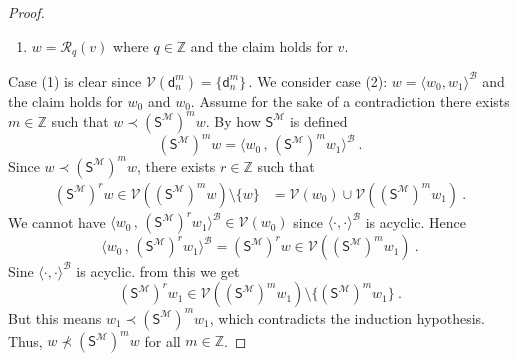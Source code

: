 \documentclass[10pt,a4paper, openany,  oldfontcommands]{memoir}
\newtheorem{open problem} [theorem] {Open Problem}
\newtheorem{open question} [theorem] {Open Question}
\renewcommand{\mathrm}{\mathsf}
\begin{document}
\begin{proof}
\begin{enumerate}
\item    $  w  =  \mathcal{R}_q  \left(  v  \right)  $   where   $  q  \in  \mathbb{Z}   $  and the claim holds for  $  v $. 
\end{enumerate}
Case (1) is clear since  $  \mathcal{V} \left(  \mathsf{d}^m_n  \right)  =  \lbrace    \mathsf{d}^m_n    \rbrace   \,   $. 
 We consider   case  (2):    $  w  =  \langle  w_0,  w_1  \rangle^{  \mathcal{B} }  $  and the claim holds for  $  w_0$  and $ w_0  $. 
 Assume for the sake of a contradiction there exists  $  m  \in  \mathbb{Z}  $  such that     $  w  \prec      \left(  \mathrm{S}^{  \mathcal{M} }  \right)^m  w   $.
   By how    $  \mathrm{S}^{  \mathcal{M} }  $  is defined 
 \[
  \left(  \mathrm{S}^{  \mathcal{M} }  \right)^m  w
  = 
    \langle  w_0   \,  ,   \,     \left(  \mathrm{S}^{  \mathcal{M} }  \right)^m  w_1  \rangle^{  \mathcal{B} }  
    \         .
 \]
 Since   $  w  \prec      \left(  \mathrm{S}^{  \mathcal{M} }  \right)^m  w   $,    
 there exists  $  r  \in  \mathbb{Z}  $    such that  
\begin{align*}
  \left(  \mathrm{S}^{  \mathcal{M} }  \right)^r  w   \in     \mathcal{V}  \left(   \left(  \mathrm{S}^{  \mathcal{M} }  \right)^m  w    \right)   \setminus  \lbrace  w  \rbrace 
  & =  
 \mathcal{V}  \left(   w_0     \right)   \cup    \mathcal{V}  \left(   \left(  \mathrm{S}^{  \mathcal{M} }  \right)^m  w_1    \right) 
\     .
\end{align*}
We cannot have   $    \langle  w_0   \,  ,   \,     \left(  \mathrm{S}^{  \mathcal{M} }  \right)^r  w_1  \rangle^{  \mathcal{B} }   
   \in    \mathcal{V} \left(   w_0     \right)  $
since   $  \langle  \cdot  ,  \cdot  \rangle^{  \mathcal{B} }  $  is acyclic. 
Hence      
\[
     \langle  w_0   \,  ,   \,     \left(  \mathrm{S}^{  \mathcal{M} }  \right)^r  w_1  \rangle^{  \mathcal{B} }  
   =  
      \left(  \mathrm{S}^{  \mathcal{M} }  \right)^r  w   
    \in 
         \mathcal{V}  \left(   \left(  \mathrm{S}^{  \mathcal{M} }  \right)^m  w_1    \right)   
    \        .
    \]
 Sine     $  \langle  \cdot  ,  \cdot  \rangle^{  \mathcal{B} }  $  is acyclic.    from this we get  
\[
  \left(  \mathrm{S}^{    \mathcal{M} }  \right)^r    w_1  \in   \mathcal{V}  \left(   \left(  \mathrm{S}^{  \mathcal{M} }  \right)^m  w_1    \right) 
  \setminus  \lbrace  \left(  \mathrm{S}^{  \mathcal{M} }  \right)^m  w_1    \rbrace    
  \     .
  \]
But this means   $  w_1    \prec   \left(  \mathrm{S}^{  \mathcal{M} }  \right)^m  w_1   $, 
which contradicts the induction hypothesis. 
Thus,    $  w    \not\prec      \left(  \mathrm{S}^{  \mathcal{M} }  \right)^m  w   $  for all  $  m  \in  \mathbb{Z}  $.








\end{proof}
\end{document}

